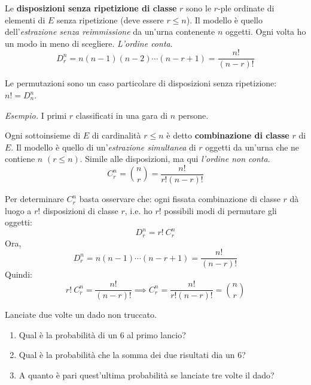 \begin{definition}
	Le \textbf{disposizioni senza ripetizione di classe} $r$ sono le $r$-ple ordinate di elementi di $E$ senza ripetizione (deve essere $r\leq n$). Il modello è quello dell'\textit{estrazione senza reimmissione} da un'urna contenente $n$ oggetti. Ogni volta ho un modo in meno di scegliere. \textit{L'ordine conta}.
	\begin{equation*}
		\boxed{D_{r}^{n} =n(n-1)(n-2) \cdots (n-r+1) =\frac{n!}{(n-r) !}}
	\end{equation*}
\end{definition}

\begin{oss}
	Le permutazioni sono un caso particolare di disposizioni senza ripetizione: $n!=D_{n}^{n}$.
\end{oss}

\textit{Esempio.} I primi $r$ classificati in una gara di $n$ persone.

\begin{definition}
	Ogni sottoinsieme di $E$ di cardinalità $r\leq n$ è detto \textbf{combinazione di classe} $r$ di $E$. Il modello è quello di un'\textit{estrazione simultanea} di $r$ oggetti da un'urna che ne contiene $n$ $(r\leq n)$. Simile alle disposizioni, ma qui \textit{l'ordine non conta}.
	\begin{equation*}
		\boxed{C_{r}^{n} =\binom{n}{r} =\frac{n!}{r!(n-r) !}}
	\end{equation*}
\end{definition}

\begin{oss}
Per determinare $C_{r}^{n}$ basta osservare che: ogni fissata combinazione di classe $r$ dà luogo a $r!$ disposizioni di classe $r$, i.e. ho $r!$ possibili modi di permutare gli oggetti:
	\begin{equation*}
		D_{r}^{n} =r!\ C_{r}^{n}
	\end{equation*}
	Ora,
	\begin{equation*}
		D_{r}^{n} =n(n-1) \cdots (n-r+1) =\frac{n!}{(n-r) !}
	\end{equation*}
	Quindi:
	\begin{equation*}
		r!\ C_{r}^{n} =\frac{n!}{(n-r) !} \implies C_{r}^{n} =\frac{n!}{r!(n-r) !} =\binom{n}{r}
	\end{equation*}
\end{oss}

\Esercizio{}

Lanciate due volte un dado non truccato.
\begin{enumerate}
	\item Qual è la probabilità di un $6$ al primo lancio?
	\item Qual è la probabilità che la somma dei due risultati dia un $6$?
	\item A quanto è pari quest'ultima probabilità se lanciate tre volte il dado?
\end{enumerate}

